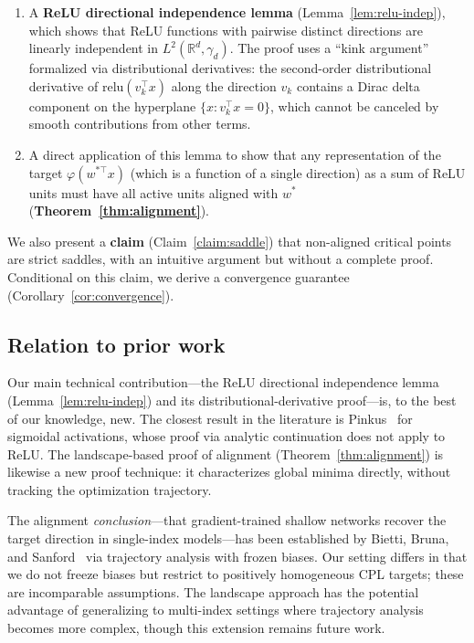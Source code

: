\documentclass[11pt]{amsart}
\theoremstyle{definition}
\newcommand{\R}{\mathbb{R}}
\newcommand{\relu}{\mathrm{relu}}
\begin{document}
\begin{enumerate}[label=(\roman*)]
\item A \textbf{ReLU directional independence lemma} (Lemma~\ref{lem:relu-indep}), which shows that ReLU functions with pairwise distinct directions are linearly independent in $L^2(\R^d, \gamma_d)$. The proof uses a ``kink argument'' formalized via distributional derivatives: the second-order distributional derivative of $\relu(v_k^\top x)$ along the direction $v_k$ contains a Dirac delta component on the hyperplane $\{x : v_k^\top x = 0\}$, which cannot be canceled by smooth contributions from other terms.

\item A direct application of this lemma to show that any representation of the target $\varphi(w^{*\top}x)$ (which is a function of a single direction) as a sum of ReLU units must have all active units aligned with $w^*$ (\textbf{Theorem~\ref{thm:alignment}}).
\end{enumerate}

We also present a \textbf{claim} (Claim~\ref{claim:saddle}) that non-aligned critical points are strict saddles, with an intuitive argument but without a complete proof. Conditional on this claim, we derive a convergence guarantee (Corollary~\ref{cor:convergence}).

\subsection{Relation to prior work}

Our main technical contribution---the ReLU directional independence lemma (Lemma~\ref{lem:relu-indep}) and its distributional-derivative proof---is, to the best of our knowledge, new. The closest result in the literature is Pinkus~\cite{pinkus1999} for sigmoidal activations, whose proof via analytic continuation does not apply to ReLU. The landscape-based proof of alignment (Theorem~\ref{thm:alignment}) is likewise a new proof technique: it characterizes global minima directly, without tracking the optimization trajectory.

The alignment \emph{conclusion}---that gradient-trained shallow networks recover the target direction in single-index models---has been established by Bietti, Bruna, and Sanford~\cite{bietti2022} via trajectory analysis with frozen biases. Our setting differs in that we do not freeze biases but restrict to positively homogeneous CPL targets; these are incomparable assumptions. The landscape approach has the potential advantage of generalizing to multi-index settings where trajectory analysis becomes more complex, though this extension remains future work.
\end{document}
